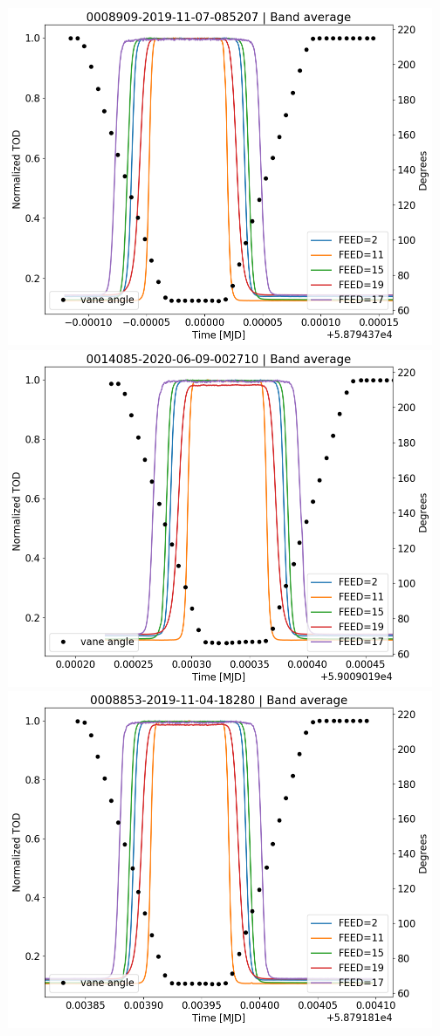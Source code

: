\documentclass[10pt, a4paper]{article}
\begin{document}
\begin{figure}[H]
    \centering
    \includegraphics[scale=0.34]{../plots/tod_angle_0008909-2019-11-07-085207.png}
    \includegraphics[scale=0.34]{../plots/tod_angle_0014085-2020-06-09-002710.png}
    \includegraphics[scale=0.34]{../plots/tod_angle_0008853-2019-11-04-18280.png}

\end{figure}
\end{document}
